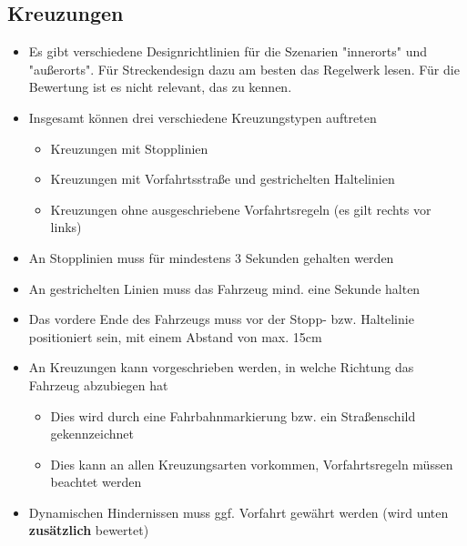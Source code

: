\documentclass[a4paper, 11pt,usegeometry]{scrartcl}
\begin{document}
\subsection*{Kreuzungen}

\begin{itemize}
  \item Es gibt verschiedene Designrichtlinien für die Szenarien "innerorts" und "außerorts". Für
  Streckendesign dazu am besten das Regelwerk lesen. Für die Bewertung ist es nicht relevant,
  das zu kennen.
  \item Insgesamt können drei verschiedene Kreuzungstypen auftreten
  \begin{itemize}
    \item Kreuzungen mit Stopplinien
    \item Kreuzungen mit Vorfahrtsstraße und gestrichelten Haltelinien
    \item Kreuzungen ohne ausgeschriebene Vorfahrtsregeln (es gilt rechts vor links)
  \end{itemize}
  \item An Stopplinien muss für mindestens 3 Sekunden gehalten werden
  \item An gestrichelten Linien muss das Fahrzeug mind. eine Sekunde halten
  \item Das vordere Ende des Fahrzeugs muss vor der Stopp- bzw. Haltelinie positioniert sein, mit einem Abstand von max. 15cm
  \item An Kreuzungen kann vorgeschrieben werden, in welche Richtung das Fahrzeug abzubiegen hat
  \begin{itemize}
    \item Dies wird durch eine Fahrbahnmarkierung bzw. ein Straßenschild gekennzeichnet
    \item Dies kann an allen Kreuzungsarten vorkommen, Vorfahrtsregeln müssen beachtet werden
  \end{itemize}
  \item Dynamischen Hindernissen muss ggf. Vorfahrt gewährt werden (wird unten \textbf{zusätzlich}
  bewertet)
\end{itemize}
\end{document}
